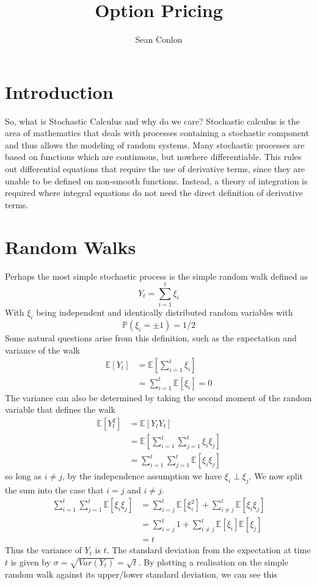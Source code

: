 \documentclass{article}
\title{Option Pricing}
\author{Sean Conlon}
\begin{document}
\maketitle

\section{Introduction}

So, what is Stochastic Calculus and why do we care? Stochastic calculus is the area of mathematics that deals with processes containing a stochastic component and thus allows the modeling of random systems. Many stochastic processes are based on functions which are continuous, but nowhere differentiable. This rules out differential equations that require the use of derivative terms, since they are unable to be defined on non-smooth functions. Instead, a theory of integration is required where integral equations do not need the direct definition of derivative terms. 

\section{Random Walks}
Perhaps the most simple stochastic process is the simple random walk defined as 
$$Y_t = \sum_{i=1}^{t}\xi_i$$
With $\xi_i$ being independent and identically distributed random variables with $$\mathbb{P}(\xi_i = \pm 1) = 1/2$$
Some natural questions arise from this definition, such as the expectation and variance of the walk
\begin{align*}
    \mathbb{E}[Y_t] &=  \mathbb{E}\left[\sum_{i=1}^{t}\xi_i\right] \\
    &= \sum_{i=1}^{t}\mathbb{E}[\xi_i] = 0
\end{align*}
The variance can also be determined by taking the second moment of the random variable that defines the walk
\begin{align*}
    \mathbb{E}[Y_t^2] &= \mathbb{E}[Y_t Y_t]\\
    &= \mathbb{E}\left[\sum_{i=1}^{t}\sum_{j=1}^{t}\xi_i \xi_j \right] \\
    &= \sum_{i=1}^{t}\sum_{j=1}^{t}\mathbb{E}[\xi_i \xi_j ]
\end{align*}
so long as $i\neq j$, by the independence assumption we have $\xi_i \perp \xi_j$. We now split the sum into the case that $i=j$ and $i\neq j$. 
\begin{align*}
    \sum_{i=1}^{t}\sum_{j=1}^{t}\mathbb{E}[\xi_i \xi_j ] &= \sum_{i=j}^{t}\mathbb{E}[\xi_i^2] + \sum_{i\neq j}^{t}\mathbb{E}[\xi_i \xi_j] \\
    &= \sum_{i=j}^{t} 1 + \sum_{i\neq j}^{t}\mathbb{E}[\xi_i]\mathbb{E}[ \xi_j] \\
    &= t
\end{align*}
Thus the variance of $Y_t$ is $t$. The standard deviation from the expectation at time $t$ is given by $\sigma = \sqrt{Var(Y_t)} = \sqrt{t}$. By plotting a realisation on the simple random walk against its upper/lower standard deviation, we can see this
\end{document}
